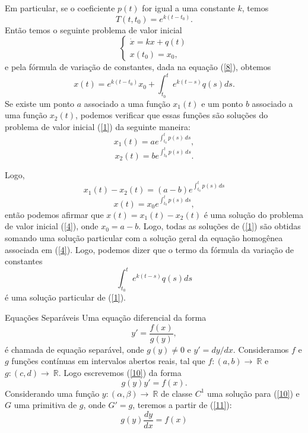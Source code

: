 \documentclass[blue]{beamer}
\numberwithin{equation}{section}
\begin{document}
\begin{frame}
	\justifying
\hspace{0.2cm} Em particular, se o coeficiente $p(t)$ for igual a uma constante $k$, temos
$$T(t,t_0) = e^{k(t-t_0)}.$$
Então temos o seguinte problema de valor inicial
$$\left\lbrace
\begin{array}{lcl} 
\dot{x} = kx + q(t)\\
x(t_{0})= x_{0},
\end{array}
\right.$$
e pela fórmula de variação de constantes, dada na equação (\ref{8}), obtemos
$$x(t)=e^{k(t-t_0)}x_0 + \int_{t_{0}}^{t} e^{k(t-s)}q(s)ds.$$
\hspace{0.2cm} Se existe um ponto $a$ associado a uma função $x_1(t)$ e um ponto $b$ associado a uma função $x_2(t)$, podemos verificar que essas funções são soluções do problema de valor inicial (\ref{1}) da seguinte maneira: 
$$x_1(t) = ae^{\int_{t_0}^{t} p(s) \,ds},$$
$$x_2(t) = be^{\int_{t_0}^{t} p(s) \,ds}.$$
	
\end{frame}

\begin{frame}
	\justifying
Logo,
$$x_1(t)- x_2(t) = (a-b)e^{\int_{t_0}^{t} p(s) \,ds}$$
$$x(t) = x_0e^{\int_{t_0}^{t} p(s) \,ds},$$
então podemos afirmar que $x(t) = x_1(t) - x_2(t)$ é uma solução do problema de valor inicial (\ref{4}), onde $x_0 = a - b$. Logo, todas as soluções de (\ref{1}) são obtidas somando uma solução particular com a solução geral da equação homogênea associada em (\ref{4}). Logo, podemos dizer que o termo da fórmula da variação de constantes 
$$\int_{t_{0}}^{t} e^{k(t-s)}q(s)ds$$
é uma solução particular de (\ref{1}). 
	
\end{frame}

\begin{frame}{Equações Separáveis}
\justifying
\hspace{0.2cm} Uma equação diferencial da forma
\begin{equation} \label{10}
y' = \dfrac{f(x)}{g(y)},
\end{equation}
é chamada de equação separável, onde $g(y) \neq 0$ e $y' = dy / dx$. Consideramos $f$ e $g$ funções contínuas em intervalos abertos reais, tal que $f: (a,b) \rightarrow \ \mathbb{R}$ e $g: (c,d) \rightarrow \ \mathbb{R}$. Logo escrevemos (\ref{10}) da forma
\begin{equation} \label{11}
g(y)y' = f(x).
\end{equation}
\hspace{0.2cm} Considerando uma função $y: (\alpha, \beta) \rightarrow \ \mathbb{R}$ de classe $C^{1}$ uma solução para (\ref{10}) e $G$ uma primitiva de $g$, onde $G' = g$, teremos a partir de (\ref{11}):
$$g(y) \dfrac{dy}{dx} = f(x)$$

\end{frame}
\end{document}
